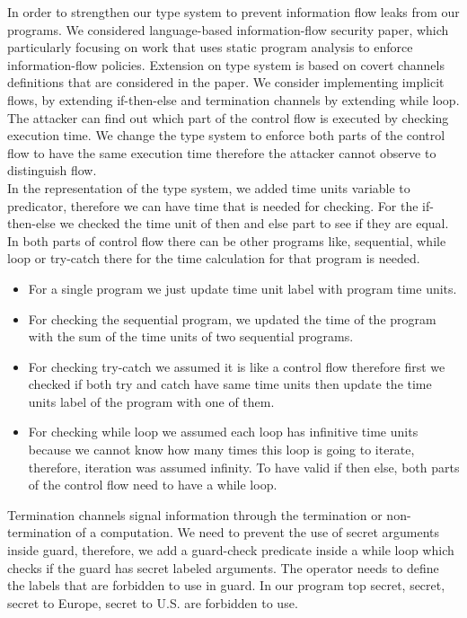 \documentclass[../extensions.tex]{subfiles}
\begin{document}
In order to strengthen our type system to prevent information flow leaks from our programs. We considered language-based information-flow security paper, which particularly focusing on work that uses static program analysis to enforce information-flow policies. Extension on type system is based on covert channels definitions that are considered in the paper. We consider implementing implicit flows, by extending if-then-else and termination channels by extending while loop.
\newline
\\
The attacker can find out which part of the control flow is executed by checking execution time. We change the type system to enforce both parts of the control flow to have the same execution time therefore the attacker cannot observe to distinguish flow.
\newline
\\
In the representation of the type system, we added time units variable to predicator, therefore we can have time that is needed for checking. For the if-then-else we checked the time unit of then and else part to see if they are equal. In both parts of control flow there can be other programs like, sequential, while loop or try-catch there for the time calculation for that program is needed.

\begin{itemize}
	\item For a single program we just update time unit label with program time units.
	\item For checking the sequential program, we updated the time of the program with the sum of the time units of two sequential programs.
	\item For checking try-catch we assumed it is like a control flow therefore first we checked if both try and catch have same time units then update the time units label of the program with one of them.  
	\item For checking while loop we assumed each loop has infinitive time units because we cannot know how many times this loop is going to iterate, therefore, iteration was assumed infinity. To have valid if then else, both parts of the control flow need to have a while loop.
\end{itemize}

\noindent
Termination channels signal information through the termination or non-termination of a computation. We need to prevent the use of secret arguments inside guard, therefore, we add a guard-check predicate inside a while loop which checks if the guard has secret labeled arguments. The operator needs to define the labels that are forbidden to use in guard. In our program top secret, secret, secret to Europe, secret to U.S. are forbidden to use. 
\end{document}
